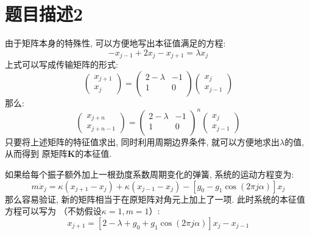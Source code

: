\documentclass[a4paper,zihao=5,UTF8]{ctexart}
\newcommand{\mb}[1]{\mathbf{#1}}
\begin{document}
	\section{题目描述2}
	由于矩阵本身的特殊性, 可以方便地写出本征值满足的方程:
	\begin{equation}
		-x_{j-1} + 2x_{j} - x_{j+1} = \lambda x_{j}
	\end{equation}
	上式可以写成传输矩阵的形式:
	\begin{equation}
		\begin{pmatrix}
			x_{j+1}\\
			x_{j}
		\end{pmatrix} = 
		\begin{pmatrix}
			2-\lambda & -1\\
			1 & 0\\
		\end{pmatrix}
		\begin{pmatrix}
			x_j\\
			x_{j-1}
		\end{pmatrix}
	\end{equation}
	那么:
	\begin{equation}
		\begin{pmatrix}
			x_{j+n}\\
			x_{j+n-1}
		\end{pmatrix}=
		\begin{pmatrix}
			2-\lambda & -1\\
			1 & 0\\
		\end{pmatrix}^{n}
		\begin{pmatrix}
			x_j\\
			x_{j-1}
		\end{pmatrix}
	\end{equation}
	只要将上述矩阵的特征值求出, 同时利用周期边界条件, 就可以方便地求出$\lambda$的值, 从而得到
	原矩阵$\mb{K}$的本征值.
	\par 
	如果给每个振子额外加上一根劲度系数周期变化的弹簧, 系统的运动方程变为:
	\begin{equation}
		m\ddot{x}_{j} = \kappa(x_{j + 1} - x_j) + \kappa(x_{j - 1} - x_{j}) - 
		[g_0 - g_1\cos(2\pi j\alpha)]x_j
	\end{equation}
	那么容易验证, 新的矩阵相当于在原矩阵对角元上加上了一项. 此时系统的本征值方程可以写为
	（不妨假设$\kappa=1, m=1$）:
	\begin{equation}
		x_{j+1} = \left[2 - \lambda + g_0 + g_1\cos(2\pi j\alpha)\right]x_j - x_{j-1}
	\end{equation}
\end{document}
